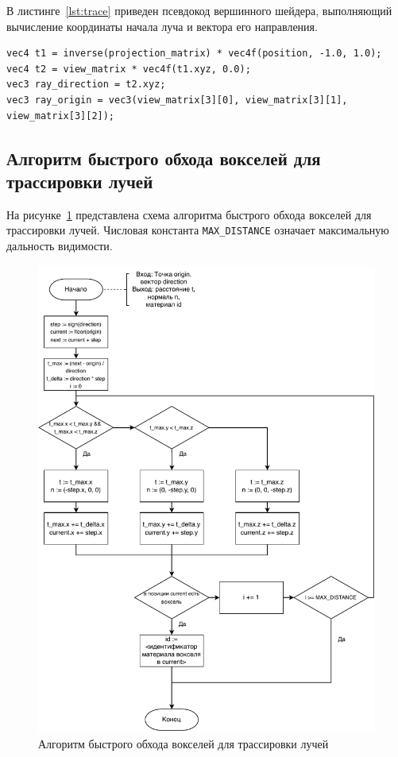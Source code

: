 В листинге~\ref{lst:trace} приведен псевдокод вершинного шейдера, выполняющий вычисление
координаты начала луча и вектора его направления.

\begin{lstlisting}[caption={Вычисление координаты начала луча и вектора его направления},label={lst:trace},frame=single]
vec4 t1 = inverse(projection_matrix) * vec4f(position, -1.0, 1.0);
vec4 t2 = view_matrix * vec4f(t1.xyz, 0.0);
vec3 ray_direction = t2.xyz;
vec3 ray_origin = vec3(view_matrix[3][0], view_matrix[3][1], view_matrix[3][2]);
\end{lstlisting}

\subsection{Алгоритм быстрого обхода вокселей для трассировки лучей}

На рисунке~\ref{img:traverse} представлена схема алгоритма быстрого 
обхода вокселей для трассировки лучей. Числовая константа \verb|MAX_DISTANCE| 
означает максимальную дальность видимости.

\begin{figure}[H]
	\centering
	\includegraphics[width=120mm]{inc/pdf/traverse}
	\caption{Алгоритм быстрого обхода вокселей для трассировки лучей}
	\label{img:traverse}
\end{figure}

